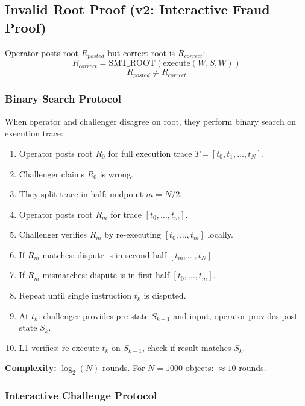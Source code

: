 \documentclass[a4paper,11pt]{article}
\begin{document}
\subsection{Invalid Root Proof (v2: Interactive Fraud Proof)}

Operator posts root $R_{posted}$ but correct root is $R_{correct}$:
\[
    R_{correct} = \text{SMT\_ROOT}(\text{execute}(W, S, W))
\]
\[
    R_{posted} \neq R_{correct}
\]

\subsubsection{Binary Search Protocol}

When operator and challenger disagree on root, they perform binary search on execution trace:

\begin{enumerate}[nosep]
    \item Operator posts root $R_0$ for full execution trace $T = [t_0, t_1, \ldots, t_N]$.
    \item Challenger claims $R_0$ is wrong.
    \item They split trace in half: midpoint $m = N/2$.
    \item Operator posts root $R_m$ for trace $[t_0, \ldots, t_m]$.
    \item Challenger verifies $R_m$ by re-executing $[t_0, \ldots, t_m]$ locally.
    \item If $R_m$ matches: dispute is in second half $[t_m, \ldots, t_N]$.
    \item If $R_m$ mismatches: dispute is in first half $[t_0, \ldots, t_m]$.
    \item Repeat until single instruction $t_k$ is disputed.
    \item At $t_k$: challenger provides pre-state $S_{k-1}$ and input, operator provides post-state $S_k$.
    \item L1 verifies: re-execute $t_k$ on $S_{k-1}$, check if result matches $S_k$.
\end{enumerate}

\textbf{Complexity:} $\log_2(N)$ rounds. For $N = 1000$ objects: $\approx 10$ rounds.

\subsubsection{Interactive Challenge Protocol}
\end{document}
